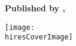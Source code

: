 
\thispagestyle{empty}

\begin{center}
    \bfseries \sffamily \Huge \mytitle\par
    \bfseries \LARGE \mysubtitle\par
    ~\\
    ~\\
    \bfseries \small Published by \mypublishingcompany, \mypublishingcompanylocation\par
	
    \ifxetex
        \texttt{[image: \\hiresCoverImage]}
    \else
    \fi
\end{center}